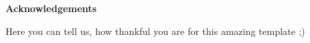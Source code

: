 \begin{center}\Large\bfseries Acknowledgements\end{center}\vspace*{1cm}\noindent 
Here you can tell us, how thankful you are for this amazing template ;)